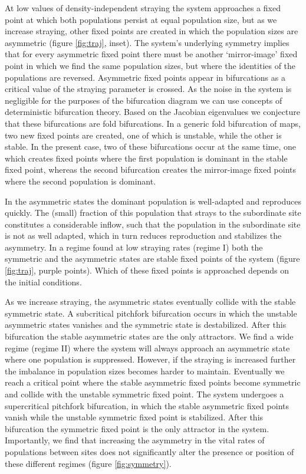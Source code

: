 \documentclass{revtex4}
\begin{document}
\noindent At low values of density-independent straying the system approaches a fixed point at which both populations persist at equal population size, but as we increase straying, other fixed points are created in which the population sizes are asymmetric (figure \ref{fig:traj}, inset).
The system's underlying symmetry implies that for every asymmetric fixed point there must be another `mirror-image' fixed point in which we find the same population sizes, but where the identities of the populations are reversed.
Asymmetric fixed points appear in bifurcations as a critical value of the straying parameter is crossed. 
As the noise in the system is negligible for the purposes of the bifurcation diagram we can use concepts of deterministic bifurcation theory. 
Based on the Jacobian eigenvalues we conjecture that these bifurcations are fold bifurcations. 
In a generic fold bifurcation of maps, two new fixed points are created, one of which is unstable, while the other is stable. 
In the present case, two of these bifurcations occur at the same time, one which creates fixed points where the first population is dominant in the stable fixed point, whereas the second bifurcation creates the mirror-image fixed points where the second population is dominant.      

In the asymmetric states the dominant population is well-adapted and reproduces quickly. 
The (small) fraction of this population that strays to the subordinate site constitutes a considerable inflow, such that the population in the subordinate site is not as well adapted, which in turn reduces reproduction and stabilizes the asymmetry. 
In a regime found at low straying rates (regime I) both the symmetric and the asymmetric states are stable fixed points of the system (figure \ref{fig:traj}, purple points). 
Which of these fixed points is approached depends on the initial conditions. 

As we increase straying, the asymmetric states eventually collide with the stable symmetric state. 
A subcritical pitchfork bifurcation occurs in which the unstable asymmetric states vanishes and the symmetric state is destabilized. 
After this bifurcation the stable asymmetric states are the only attractors. 
We find a wide regime (regime II) where the system will always approach an asymmetric state where one population is suppressed. 
However, if the straying is increased further the imbalance in population sizes becomes harder to maintain. 
Eventually we reach a critical point where the stable asymmetric fixed points become symmetric and collide with the unstable symmetric fixed point. 
The system undergoes a supercritical pitchfork bifurcation, in which the stable asymmetric fixed points vanish while the unstable symmetric fixed point is stabilized. 
After this bifurcation the symmetric fixed point is the only attractor in the system. 
Importantly, we find that increasing the asymmetry in the vital rates of populations between sites does not significantly alter the presence or position of these different regimes (figure \ref{fig:symmetry}).\\
\end{document}

